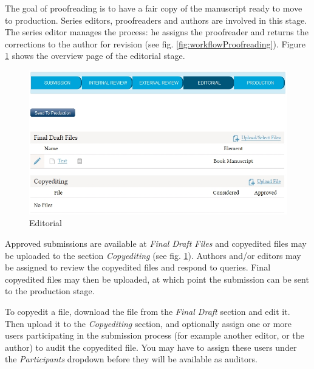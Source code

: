 The goal of proofreading is to have a fair copy of the manuscript ready to move to production. Series editors, proofreaders and authors are involved in this stage. The series editor manages the process: he assigns the proofreader and returns the corrections to the author for revision (see fig. \ref{fig:workflowProofreading}). Figure \ref{fig:editorial} shows the overview page of the editorial stage. 

\begin{figure}[h] \centering
\includegraphics[width=1\textwidth]{./img/editorial.jpg} \caption{Editorial}
\label{fig:editorial}
\end{figure}

\newpage


Approved submissions are available at \textit{Final Draft Files} and copyedited files may be uploaded to the section \textit{Copyediting} (see fig. \ref{fig:editorial}). Authors and/or editors may be assigned to review the copyedited files and respond to queries. Final copyedited files may then be uploaded, at which point the submission can be sent to the production stage.

To copyedit a file, download the file from the \textit{Final Draft} section and edit it. Then upload it to the \textit{Copyediting} section, and optionally assign one or more users participating in the submission process (for example another editor, or the author) to audit the copyedited file. You may have to assign these users under the \textit{Participants} dropdown before they will be available as auditors.


